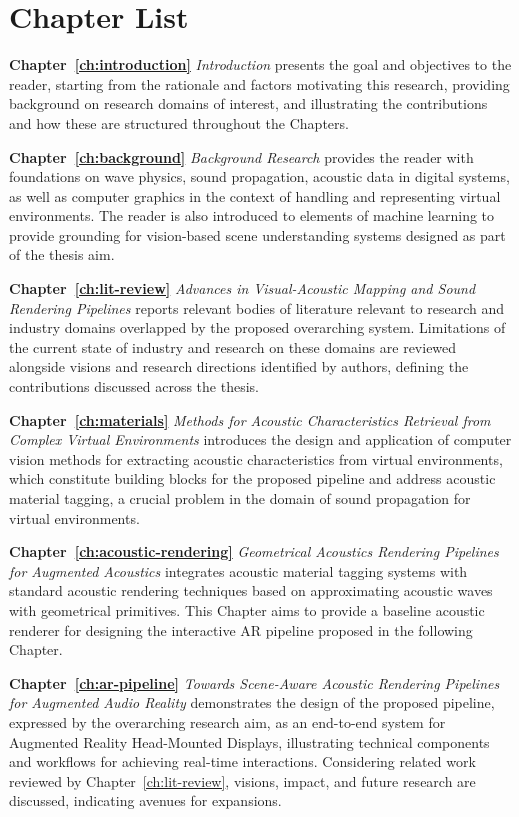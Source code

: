 \section{Chapter List}
\textbf{Chapter~\ref{ch:introduction}} \textit{Introduction} presents the goal and objectives to the reader, starting from the rationale and factors motivating this research, providing background on research domains of interest, and illustrating the contributions and how these are structured throughout the Chapters.

\textbf{Chapter~\ref{ch:background}} \textit{Background Research} provides the reader with foundations on wave physics, sound propagation, acoustic data in digital systems, as well as computer graphics in the context of handling and representing virtual environments. The reader is also introduced to elements of machine learning to provide grounding for vision-based scene understanding systems designed as part of the thesis aim.

\textbf{Chapter~\ref{ch:lit-review}} \textit{Advances in Visual-Acoustic Mapping and Sound Rendering Pipelines} reports relevant bodies of literature relevant to research and industry domains overlapped by the proposed overarching system. Limitations of the current state of industry and research on these domains are reviewed alongside visions and research directions identified by authors, defining the contributions discussed across the thesis.

\textbf{Chapter~\ref{ch:materials}} \textit{Methods for Acoustic Characteristics Retrieval from Complex Virtual Environments} introduces the design and application of computer vision methods for extracting acoustic characteristics from virtual environments, which constitute building blocks for the proposed pipeline and address acoustic material tagging, a crucial problem in the domain of sound propagation for virtual environments.

\textbf{Chapter~\ref{ch:acoustic-rendering}} \textit{Geometrical Acoustics Rendering Pipelines for Augmented Acoustics} integrates acoustic material tagging systems with standard acoustic rendering techniques based on approximating acoustic waves with geometrical primitives. This Chapter aims to provide a baseline acoustic renderer for designing the interactive AR pipeline proposed in the following Chapter.

\textbf{Chapter~\ref{ch:ar-pipeline}} \textit{Towards Scene-Aware Acoustic Rendering Pipelines for Augmented Audio Reality} demonstrates the design of the proposed pipeline, expressed by the overarching research aim, as an end-to-end system for Augmented Reality Head-Mounted Displays, illustrating technical components and workflows for achieving real-time interactions. Considering related work reviewed by Chapter~\ref{ch:lit-review}, visions, impact, and future research are discussed, indicating avenues for expansions.

